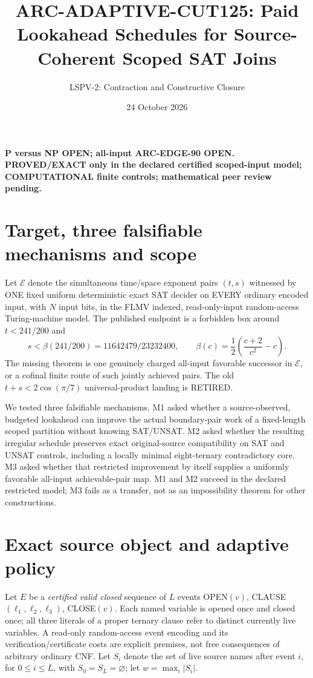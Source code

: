 \documentclass[11pt]{article}
\title{ARC-ADAPTIVE-CUT125: Paid Lookahead Schedules for Source-Coherent Scoped SAT Joins}
\author{LSPV-2: Contraction and Constructive Closure}
\date{24 October 2026}
\begin{document}
\maketitle
\begin{center}
\textbf{P versus NP OPEN; all-input ARC-EDGE-90 OPEN.}\\
\textbf{PROVED/EXACT only in the declared certified scoped-input model; COMPUTATIONAL finite controls; mathematical peer review pending.}
\end{center}

\section{Target, three falsifiable mechanisms and scope}
Let $\mathcal E$ denote the simultaneous time/space exponent pairs $(t,s)$ witnessed by ONE fixed uniform deterministic exact SAT decider on EVERY ordinary encoded input, with $N$ input bits, in the FLMV indexed, read-only-input random-access Turing-machine model. The published endpoint is a forbidden box around $t<241/200$ and
\[
s<\beta(241/200)=11642479/23232400,\qquad
\beta(c)=\frac12\left(\frac{c+2}{c^2}-c\right).
\]
The missing theorem is one genuinely charged all-input favorable successor in $\mathcal E$, or a cofinal finite route of such jointly achieved pairs. The old $t+s<2\cos(\pi/7)$ universal-product landing is RETIRED.

We tested three falsifiable mechanisms. M1 asked whether a source-observed, budgeted lookahead can improve the actual boundary-pair work of a fixed-length scoped partition without knowing SAT/UNSAT. M2 asked whether the resulting irregular schedule preserves exact original-source compatibility on SAT and UNSAT controls, including a locally minimal eight-ternary contradictory core. M3 asked whether that restricted improvement by itself supplies a uniformly favorable all-input achievable-pair map. M1 and M2 succeed in the declared restricted model; M3 fails as a transfer, not as an impossibility theorem for other constructions.

\section{Exact source object and adaptive policy}
Let $E$ be a \emph{certified valid closed} sequence of $L$ events OPEN$(v)$, CLAUSE$(\ell_1,\ell_2,\ell_3)$, CLOSE$(v)$. Each named variable is opened once and closed once; all three literals of a proper ternary clause refer to distinct currently live variables. A read-only random-access event encoding and its verification/certificate costs are explicit premises, not free consequences of arbitrary ordinary CNF. Let $S_i$ denote the set of live source names after event $i$, for $0\le i\le L$, with $S_0=S_L=\varnothing$; let $w=\max_i|S_i|$.
\end{document}
